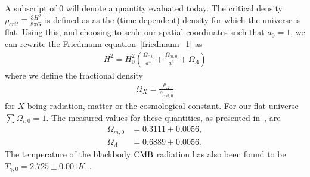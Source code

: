    A subscript of $0$ will denote a quantity evaluated today.
    The critical density $\rho_{crit}\equiv\frac{3H^2}{8\pi G}$ is defined as
    as the (time-dependent) density for which the universe is flat.
    Using this,
    and choosing to scale our spatial coordinates such that $a_0=1$,
    we can rewrite the Friedmann equation~\eqref{friedmann_1} as
    \begin{align}\label{friedmann_omega}
        H^2 = H_0^2\left(\frac{\Omega_{r,0}}{a^4}+\frac{\Omega_{m,0}}{a^3}+\Omega_{\Lambda}\right)
    \end{align}
    where we define the fractional density
    \begin{align}
        \Omega_{X} = \frac{\rho_X}{\rho_{crit,0}}
    \end{align}
    for $X$ being radiation, matter or the cosmological constant.
    For our flat universe $\sum\Omega_{i,0}=1$.
    The measured values for these quantities, as presented in~\cite{Planck_parameters_2018},
    are
    \begin{align}\label{measured_params}
        \Omega_{m,0} &= 0.3111 \pm 0.0056,\\
        \Omega_{\Lambda} &=  0.6889 \pm 0.0056.
    \end{align}
    The temperature of the blackbody $\text{CMB}$ radiation has also been
    found to be $T_{\gamma,0}=2.725\pm0.001K$~\cite{Fixsen_2009}.


